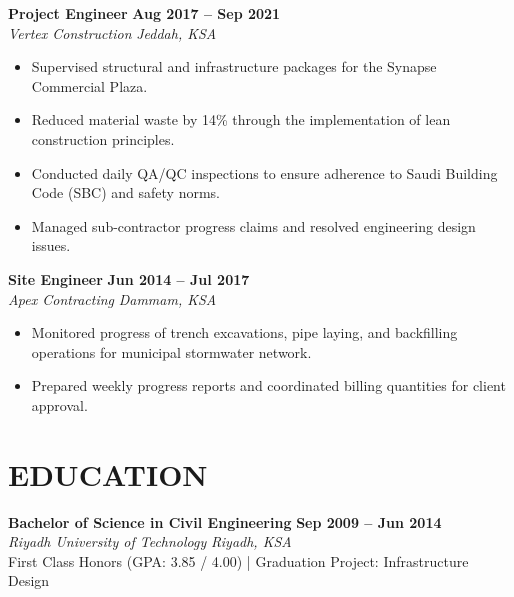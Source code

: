 \documentclass[10pt,a4paper]{article}
\begin{document}
\begin{minipage}[t]{0.63\textwidth}
    \noindent
    {\large\bfseries\color{primary} Project Engineer} \hfill {\small\bfseries\color{secondary} Aug 2017 -- Sep 2021} \\
    {\itshape\color{darktext}Vertex Construction} \hfill {\small\itshape\color{secondary} Jeddah, KSA}
    \begin{itemize}[leftmargin=12pt, topsep=3pt]
        \item Supervised structural and infrastructure packages for the Synapse Commercial Plaza.
        \item Reduced material waste by 14\% through the implementation of lean construction principles.
        \item Conducted daily QA/QC inspections to ensure adherence to Saudi Building Code (SBC) and safety norms.
        \item Managed sub-contractor progress claims and resolved engineering design issues.
    \end{itemize}
    
    \vspace{0.4cm}
    
    \noindent
    {\large\bfseries\color{primary} Site Engineer} \hfill {\small\bfseries\color{secondary} Jun 2014 -- Jul 2017} \\
    {\itshape\color{darktext}Apex Contracting} \hfill {\small\itshape\color{secondary} Dammam, KSA}
    \begin{itemize}[leftmargin=12pt, topsep=3pt]
        \item Monitored progress of trench excavations, pipe laying, and backfilling operations for municipal stormwater network.
        \item Prepared weekly progress reports and coordinated billing quantities for client approval.
    \end{itemize}
    
    \vspace{0.4cm}
    
    \section*{EDUCATION}
    
    \noindent
    {\large\bfseries\color{primary} Bachelor of Science in Civil Engineering} \hfill {\small\bfseries\color{secondary} Sep 2009 -- Jun 2014} \\
    {\itshape\color{darktext}Riyadh University of Technology} \hfill {\small\itshape\color{secondary} Riyadh, KSA} \\
    {\small\color{secondary} First Class Honors (GPA: 3.85 / 4.00) \quad | \quad Graduation Project: Infrastructure Design}
\end{minipage}
\end{document}
